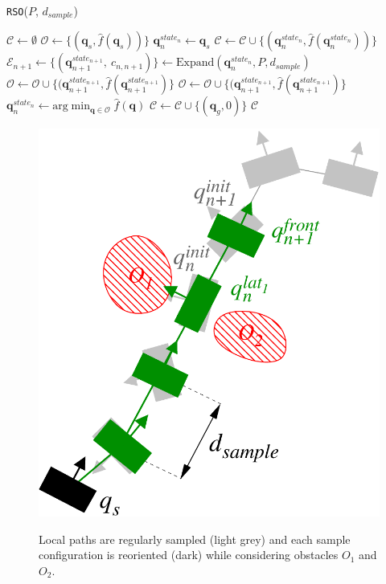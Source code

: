 \begin{algorithm}
\caption{\texttt{RSO}($P$, $d_{sample}$)}
\label{algo:chap1-rso}
\begin{algorithmic}
  \STATE $\mathcal{C} \leftarrow \emptyset$
  \STATE $\mathcal{O} \leftarrow \{(\mathbf{q}_s,\hat{f}(\mathbf{q}_s))\}$
  \STATE $\mathbf{q}_n^{state_n} \leftarrow \mathbf{q}_s$
  \STATE $\mathcal{C} \leftarrow \mathcal{C}\cup\{(\mathbf{q}_n^{state_n},\hat{f}(\mathbf{q}_n^{state_n}))\}$
  \STATE $\mathcal{E}_{n+1} \leftarrow \{(\mathbf{q}_{n+1}^{state_{n+1}},~c_{n,n+1})\} \leftarrow \text{Expand}(\mathbf{q}_n^{state_n}, P, d_{sample})$
  \STATE $\mathcal{O} \leftarrow \mathcal{O}\cup\{(\mathbf{q}_{n+1}^{state_{n+1}},\hat{f}(\mathbf{q}_{n+1}^{state_{n+1}})\}$
  \ELSE
  \STATE $\mathcal{O} \leftarrow \mathcal{O}\cup\{(\mathbf{q}_{n+1}^{state_{n+1}},\hat{f}(\mathbf{q}_{n+1}^{state_{n+1}})\}$
  \ENDIF
  \ENDIF
  \ENDFOR
  \STATE $\mathbf{q}_n^{state_n} \leftarrow
  \text{arg}\min_{\mathbf{q}\in\mathcal{O}}\hat{f}(\mathbf{q})$
  \ENDWHILE
  \STATE $\mathcal{C} \leftarrow \mathcal{C}\cup\{(\mathbf{q}_g,0)\}$
  \RETURN $\mathcal{C}$
\end{algorithmic}
\end{algorithm}

\begin{figure}
  \centering
      {\includegraphics[width = 0.6\linewidth]
        {src/chap1-path-optimization/hash-direct-path.pdf}}
      \caption{Local paths are regularly sampled (light grey) and each
        sample configuration is reoriented (dark) while considering
        obstacles $O_1$ and $O_2$.}
      \label{fig:chap1-hash-direct-path}
\end{figure}


